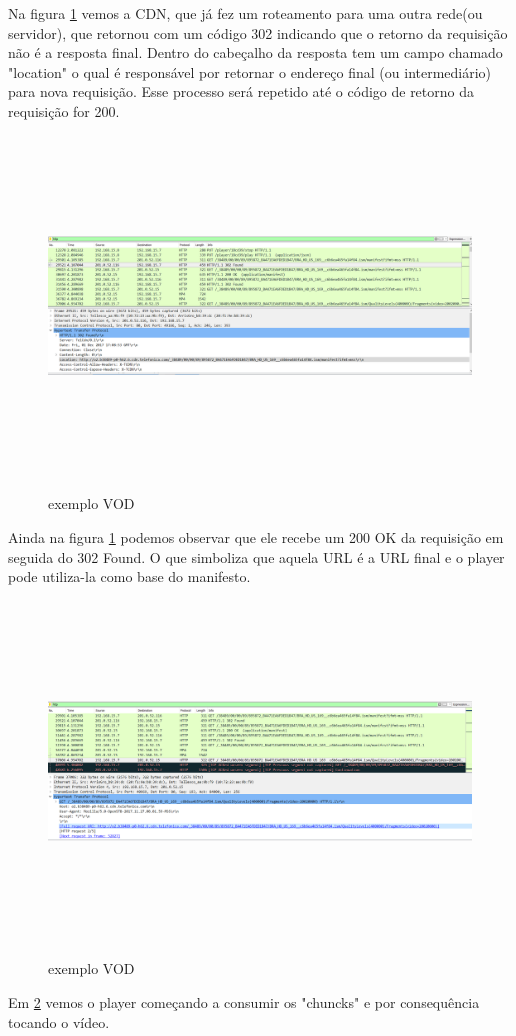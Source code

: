 Na figura \ref{figura:exemplo_vod_3} vemos a CDN, que j\'a fez um roteamento para uma outra rede(ou servidor), que retornou com um c\'odigo 302 indicando que o retorno da requisi\c{c}\~ao n\~ao \'e a resposta final. Dentro do cabe\c{c}alho da resposta tem um campo chamado "location" o qual \'e respons\'avel por retornar o endere\c{c}o final (ou intermedi\'ario) para nova requisi\c{c}\~ao. Esse processo ser\'a repetido at\'e o c\'odigo de retorno da requisi\c{c}\~ao for 200.
\begin{figure}[H]
\caption{exemplo VOD}
\includegraphics[height=9cm]{Figuras/exemplo_vod_3.png} 
\label{figura:exemplo_vod_3}
\end{figure}

Ainda na figura \ref{figura:exemplo_vod_3} podemos observar que ele recebe um 200 OK da requisi\c{c}\~ao em seguida do 302 Found. O que simboliza que aquela URL \'e a URL final e o player pode utiliza-la como base do manifesto. 

\begin{figure}[H]
\caption{exemplo VOD}
\includegraphics[height=9cm]{Figuras/exemplo_vod_4.png}
\label{figura:exemplo_vod_4}
\end{figure}

Em \ref{figura:exemplo_vod_4} vemos o player come\c{c}ando a consumir os "chuncks" e por consequ\^encia tocando o v\'ideo.